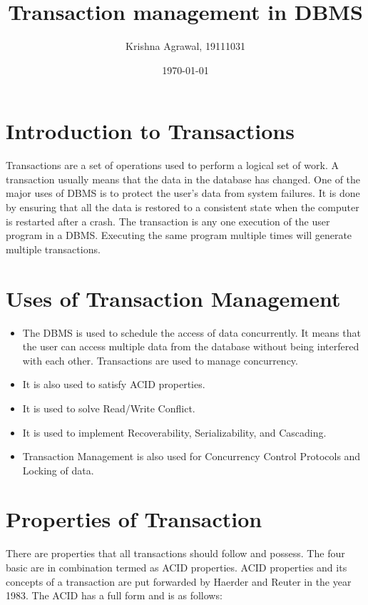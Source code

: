 \documentclass{article}
\title{Transaction management in DBMS}
\author{Krishna Agrawal, 19111031}
\date{\today}
\begin{document}
\maketitle


\section{Introduction to Transactions}

Transactions are a set of operations used to perform a logical set of work. A transaction usually means that the data in the database has changed. One of the major uses of DBMS is to protect the user’s data from system failures. It is done by ensuring that all the data is restored to a consistent state when the computer is restarted after a crash. The transaction is any one execution of the user program in a DBMS. Executing the same program multiple times will generate multiple transactions.\\

\section{Uses of Transaction Management} 

\begin{itemize}
\item The DBMS is used to schedule the access of data concurrently. It means that the user can access multiple data from the database without being interfered with each other. Transactions are used to manage concurrency.
\item It is also used to satisfy ACID properties.
\item It is used to solve Read/Write Conflict.
\item It is used to implement Recoverability, Serializability, and Cascading.
\item Transaction Management is also used for Concurrency Control Protocols and Locking of data.
\end{itemize}


\section{Properties of Transaction}

There are properties that all transactions should follow and possess. The four basic are in combination termed as ACID properties. ACID properties and its concepts of a transaction are put forwarded by Haerder and Reuter in the year 1983. The ACID has a full form and is as follows:
\end{document}
